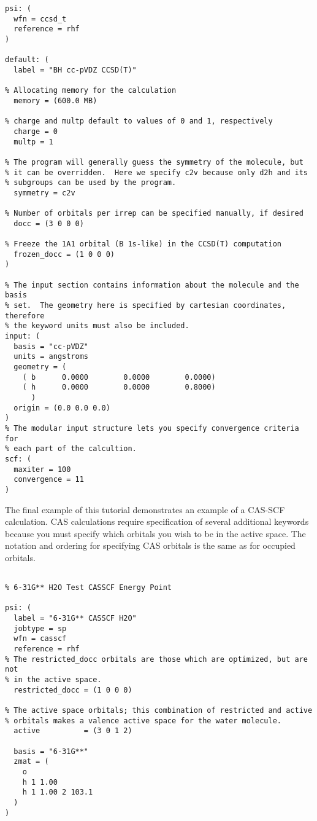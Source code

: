 \begin{verbatim}
psi: (
  wfn = ccsd_t
  reference = rhf
)

default: (
  label = "BH cc-pVDZ CCSD(T)"

% Allocating memory for the calculation
  memory = (600.0 MB)

% charge and multp default to values of 0 and 1, respectively
  charge = 0
  multp = 1

% The program will generally guess the symmetry of the molecule, but
% it can be overridden.  Here we specify c2v because only d2h and its
% subgroups can be used by the program.
  symmetry = c2v

% Number of orbitals per irrep can be specified manually, if desired
  docc = (3 0 0 0)

% Freeze the 1A1 orbital (B 1s-like) in the CCSD(T) computation
  frozen_docc = (1 0 0 0)
)

% The input section contains information about the molecule and the basis
% set.  The geometry here is specified by cartesian coordinates, therefore
% the keyword units must also be included.
input: (
  basis = "cc-pVDZ"
  units = angstroms
  geometry = (
    ( b      0.0000        0.0000        0.0000)
    ( h      0.0000        0.0000        0.8000)
      )
  origin = (0.0 0.0 0.0)
)
% The modular input structure lets you specify convergence criteria for
% each part of the calcultion.  
scf: (
  maxiter = 100
  convergence = 11
)
\end{verbatim}

The final example of this tutorial demonstrates an example of a CAS-SCF
calculation.  CAS calculations require specification of several additional
keywords because you must specify which orbitals you wish to be in the
active space.  The notation and ordering for specifying CAS orbitals is the
same as for occupied orbitals.

\begin{verbatim}

% 6-31G** H2O Test CASSCF Energy Point

psi: (
  label = "6-31G** CASSCF H2O"
  jobtype = sp
  wfn = casscf
  reference = rhf
% The restricted_docc orbitals are those which are optimized, but are not
% in the active space.
  restricted_docc = (1 0 0 0)

% The active space orbitals; this combination of restricted and active
% orbitals makes a valence active space for the water molecule.
  active          = (3 0 1 2)

  basis = "6-31G**"
  zmat = (
    o
    h 1 1.00
    h 1 1.00 2 103.1
  )
)
\end{verbatim}

